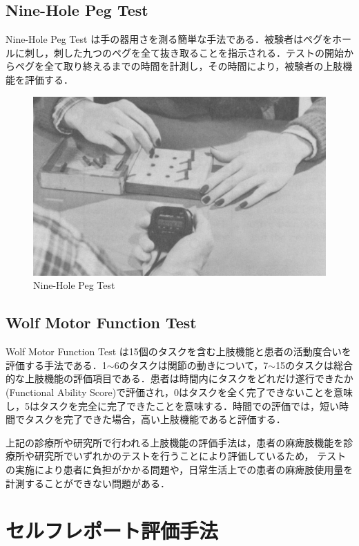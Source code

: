\subsection*{Nine-Hole Peg Test}
Nine-Hole Peg Test\cite{Mathiowetz1985,Croarkin2004,Sunderland1989}
は手の器用さを測る簡単な手法である．被験者はペグをホールに刺し，刺した九つのペグを全て抜き取ることを指示される．テストの開始からペグを全て取り終えるまでの時間を計測し，その時間により，被験者の上肢機能を評価する．
\begin{figure}[H]
  \centering
  \includegraphics[width=0.8\linewidth]{fig/ch1/nine}
  \caption{Nine-Hole Peg Test\cite{Mathiowetz}}
  \label{fig:nine}
\end{figure}

\subsection*{Wolf Motor Function Test}
Wolf Motor Function Test\cite{Lin2010,Hsieh2009,Shima2009,Nijland2010}
は15個のタスクを含む上肢機能と患者の活動度合いを評価する手法である．1$\sim$6のタスクは関節の動きについて，7$\sim$15のタスクは総合的な上肢機能の評価項目である．患者は時間内にタスクをどれだけ遂行できたか(Functional Ability Score)で評価され，0はタスクを全く完了できないことを意味し，5はタスクを完全に完了できたことを意味する．時間での評価では，短い時間でタスクを完了できた場合，高い上肢機能であると評価する．

上記の診療所や研究所で行われる上肢機能の評価手法は，患者の麻痺肢機能を診療所や研究所でいずれかのテストを行うことにより評価しているため，
テストの実施により患者に負担がかかる問題や，日常生活上での患者の麻痺肢使用量を計測することができない問題がある．

\section{セルフレポート評価手法}
